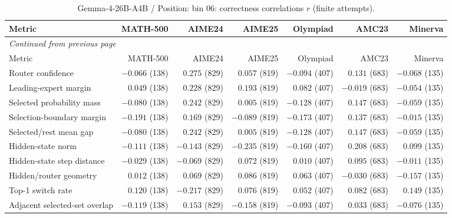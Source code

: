 \begingroup\scriptsize\setlength{\tabcolsep}{4pt}
\begin{longtable}{@{}lrrrrrr@{}}
\caption{Gemma-4-26B-A4B / Position: bin 06: correctness correlations $r$ (finite attempts).}\label{tab:multi-gemma-position-bin_06}\\
\toprule
Metric & MATH-500 & AIME24 & AIME25 & Olympiad & AMC23 & Minerva \\
\midrule\endfirsthead
\multicolumn{7}{l}{\textit{Continued from previous page}}\\
\toprule
Metric & MATH-500 & AIME24 & AIME25 & Olympiad & AMC23 & Minerva \\
\midrule\endhead
\bottomrule\endfoot
Router confidence & $-0.066$ (138) & $0.275$ (829) & $0.057$ (819) & $-0.094$ (407) & $0.131$ (683) & $-0.068$ (135) \\
Leading-expert margin & $0.049$ (138) & $0.228$ (829) & $0.193$ (819) & $0.082$ (407) & $-0.019$ (683) & $-0.054$ (135) \\
Selected probability mass & $-0.080$ (138) & $0.242$ (829) & $0.005$ (819) & $-0.128$ (407) & $0.147$ (683) & $-0.059$ (135) \\
Selection-boundary margin & $-0.191$ (138) & $0.169$ (829) & $-0.089$ (819) & $-0.173$ (407) & $0.137$ (683) & $-0.015$ (135) \\
Selected/rest mean gap & $-0.080$ (138) & $0.242$ (829) & $0.005$ (819) & $-0.128$ (407) & $0.147$ (683) & $-0.059$ (135) \\
Hidden-state norm & $-0.111$ (138) & $-0.143$ (829) & $-0.235$ (819) & $-0.160$ (407) & $0.208$ (683) & $0.099$ (135) \\
Hidden-state step distance & $-0.029$ (138) & $-0.069$ (829) & $0.072$ (819) & $0.010$ (407) & $0.095$ (683) & $-0.011$ (135) \\
Hidden/router geometry & $0.012$ (138) & $0.069$ (829) & $0.086$ (819) & $0.063$ (407) & $-0.030$ (683) & $-0.157$ (135) \\
Top-1 switch rate & $0.120$ (138) & $-0.217$ (829) & $0.076$ (819) & $0.052$ (407) & $0.082$ (683) & $0.149$ (135) \\
Adjacent selected-set overlap & $-0.119$ (138) & $0.153$ (829) & $-0.158$ (819) & $-0.093$ (407) & $0.033$ (683) & $-0.076$ (135) \\
\end{longtable}\endgroup


